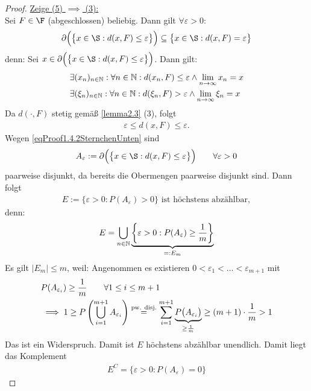 \begin{proof}
\underline{Zeige (5) $\implies$ (3):}\\
Sei $F\in\F$ (abgeschlossen) beliebig. Dann gilt $\forall\varepsilon>0:$
\begin{align}\label{eqProof1.4.2SternchenUnten}
\partial\Big(\big\lbrace x\in\S:d(x,F)\leq\varepsilon\big\rbrace\Big)
\subseteq\big\lbrace x\in\S:d(x,F)=\varepsilon\big\rbrace
\end{align}
denn: Sei $x\in\partial\Big(\big\lbrace x\in\S:d(x,F)\leq\varepsilon\big\rbrace\Big)$. Dann gilt:
\begin{align*}
&\exists (x_n)_{n\in\mathbb{N}}:\forall n\in\mathbb{N}:d(x_n,F)\leq\varepsilon\wedge \lim\limits_{n\to\infty} x_n=x\\
&\exists (\xi_n)_{n\in\mathbb{N}}:\forall n\in\mathbb{N}:d(\xi_n,F)>\varepsilon\wedge\lim\limits_{n\to\infty}\xi_n=x
\end{align*}
Da $d(\cdot,F)$ stetig gemäß \ref{lemma2.3} (3), folgt
\begin{align*}
\varepsilon\leq d(x,F)\leq\varepsilon.
\end{align*}
Wegen \eqref{eqProof1.4.2SternchenUnten} sind 
\begin{align*}
A_\varepsilon:=\partial\Big(\big\lbrace x\in\S:d(x,F)\leq\varepsilon\big\rbrace\Big)\qquad\forall\varepsilon>0
\end{align*}
paarweise disjunkt, da bereits die Obermengen paarweise disjunkt sind. Dann folgt
\begin{align}\label{eqProof1.4.2DoppelSternchenUnten}
E:=\big\lbrace\varepsilon>0:P(A_\varepsilon)>0\big\rbrace\text{ ist höchstens abzählbar},
\end{align}
denn:
\begin{align*}
E=\bigcup\limits_{n\in\mathbb{N}}\underbrace{\left\lbrace\varepsilon>0:P(A_\varepsilon)\geq\frac{1}{m}\right\rbrace}_{=:E_m}
\end{align*}
Es gilt $|E_m|\leq m$, weil: Angenommen es existieren $0<\varepsilon_1<\ldots<\varepsilon_{m+1}$ mit 
\begin{align*}
&P(A_{\varepsilon_i})\geq\frac{1}{m}\qquad\forall 1\leq i\leq m+1\\
&\implies
1\geq P\left(\bigcup\limits_{i=1}^{m+1} A_{\varepsilon_i}\right)
\stackrel{\text{pw. disj.}}{=}
\sum\limits_{i=1}^{m+1}\underbrace{P\big(A_{\varepsilon_i}\big)}_{\geq\frac{1}{m}}\geq(m+1)\cdot\frac{1}{m}>1
\end{align*}
Das ist ein Widerspruch. Damit ist $E$ höchstens abzählbar unendlich. Damit liegt das Komplement
\begin{align*}
E^C=\big\lbrace\varepsilon>0: P(A_\varepsilon)=0\big\rbrace
\end{align*}

\end{proof}

